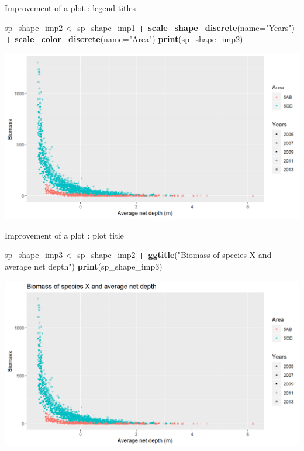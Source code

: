 \documentclass[
  ignorenonframetext,
]{beamer}
\newenvironment{Shaded}{\begin{snugshade}}{\end{snugshade}}
\newcommand{\DataTypeTok}[1]{\textcolor[rgb]{0.13,0.29,0.53}{#1}}
\newcommand{\KeywordTok}[1]{\textcolor[rgb]{0.13,0.29,0.53}{\textbf{#1}}}
\newcommand{\NormalTok}[1]{#1}
\newcommand{\OperatorTok}[1]{\textcolor[rgb]{0.81,0.36,0.00}{\textbf{#1}}}
\newcommand{\StringTok}[1]{\textcolor[rgb]{0.31,0.60,0.02}{#1}}
\begin{document}
\begin{frame}[fragile]{Improvement of a plot : legend titles}
\protect\hypertarget{improvement-of-a-plot-legend-titles}{}

\begin{Shaded}
\begin{Highlighting}[]
\NormalTok{sp_shape_imp2 <-}\StringTok{ }\NormalTok{sp_shape_imp1 }\OperatorTok{+}\StringTok{ }
\StringTok{  }\KeywordTok{scale_shape_discrete}\NormalTok{(}\DataTypeTok{name=}\StringTok{"Years"}\NormalTok{) }\OperatorTok{+}\StringTok{ }\KeywordTok{scale_color_discrete}\NormalTok{(}\DataTypeTok{name=}\StringTok{"Area"}\NormalTok{)}
\KeywordTok{print}\NormalTok{(sp_shape_imp2)}
\end{Highlighting}
\end{Shaded}

\begin{center}\includegraphics[width=0.8\linewidth]{figure/sp_shape_imp2-1} \end{center}

\end{frame}

\begin{frame}[fragile]{Improvement of a plot : plot title}
\protect\hypertarget{improvement-of-a-plot-plot-title}{}

\begin{Shaded}
\begin{Highlighting}[]
\NormalTok{sp_shape_imp3 <-}\StringTok{ }\NormalTok{sp_shape_imp2 }\OperatorTok{+}\StringTok{ }
\StringTok{  }\KeywordTok{ggtitle}\NormalTok{(}\StringTok{"Biomass of species X and average net depth"}\NormalTok{)}
\KeywordTok{print}\NormalTok{(sp_shape_imp3)}
\end{Highlighting}
\end{Shaded}

\begin{center}\includegraphics[width=0.8\linewidth]{figure/sp_shape_imp3-1} \end{center}

\end{frame}
\end{document}
